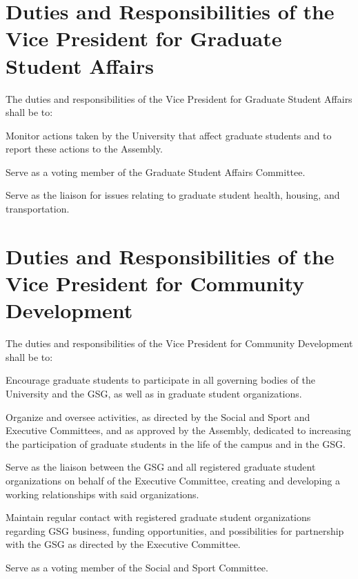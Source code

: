 \section{Duties and Responsibilities of the Vice President for Graduate Student Affairs}
The duties and responsibilities of the Vice President for Graduate Student Affairs shall be to:
\begin{bylaws-number}
  \item Monitor actions taken by the University that affect graduate students and to report these actions to the Assembly.
  \item Serve as a voting member of the Graduate Student Affairs Committee.
  \item Serve as the liaison for issues relating to graduate student health, housing, and transportation.
\end{bylaws-number}

\section{Duties and Responsibilities of the Vice President for Community Development}
The duties and responsibilities of the Vice President for Community Development shall be to:
\begin{bylaws-number}
  \item Encourage graduate students to participate in all governing bodies of the University and the GSG, as well as in graduate student organizations.
  \item Organize and oversee activities, as directed by the Social and Sport and Executive Committees, and as approved by the Assembly, dedicated to increasing the participation of graduate students in the life of the campus and in the GSG.
  \item Serve as the liaison between the GSG and all registered graduate student organizations on behalf of the Executive Committee, creating and developing a working relationships with said organizations.
  \item Maintain regular contact with registered graduate student organizations regarding GSG business, funding opportunities, and possibilities for partnership with the GSG as directed by the Executive Committee.
  \item Serve as a voting member of the Social and Sport Committee.
\end{bylaws-number}

